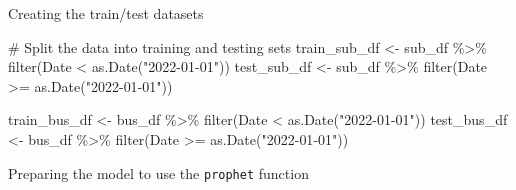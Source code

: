 \documentclass[
  letterpaper,
  DIV=11,
  numbers=noendperiod]{scrartcl}
\newenvironment{Shaded}{\begin{snugshade}}{\end{snugshade}}
\newcommand{\AttributeTok}[1]{\textcolor[rgb]{0.40,0.45,0.13}{#1}}
\newcommand{\CommentTok}[1]{\textcolor[rgb]{0.37,0.37,0.37}{#1}}
\newcommand{\DecValTok}[1]{\textcolor[rgb]{0.68,0.00,0.00}{#1}}
\newcommand{\FunctionTok}[1]{\textcolor[rgb]{0.28,0.35,0.67}{#1}}
\newcommand{\NormalTok}[1]{\textcolor[rgb]{0.00,0.23,0.31}{#1}}
\newcommand{\OtherTok}[1]{\textcolor[rgb]{0.00,0.23,0.31}{#1}}
\newcommand{\SpecialCharTok}[1]{\textcolor[rgb]{0.37,0.37,0.37}{#1}}
\newcommand{\StringTok}[1]{\textcolor[rgb]{0.13,0.47,0.30}{#1}}
\begin{document}
\begin{Shaded}
\end{Shaded}

Creating the train/test datasets

\begin{Shaded}
\begin{Highlighting}[]
\CommentTok{\# Split the data into training and testing sets}
\NormalTok{train\_sub\_df }\OtherTok{\textless{}{-}}\NormalTok{ sub\_df }\SpecialCharTok{\%\textgreater{}\%} \FunctionTok{filter}\NormalTok{(Date }\SpecialCharTok{\textless{}} \FunctionTok{as.Date}\NormalTok{(}\StringTok{"2022{-}01{-}01"}\NormalTok{))}
\NormalTok{test\_sub\_df }\OtherTok{\textless{}{-}}\NormalTok{ sub\_df }\SpecialCharTok{\%\textgreater{}\%} \FunctionTok{filter}\NormalTok{(Date }\SpecialCharTok{\textgreater{}=} \FunctionTok{as.Date}\NormalTok{(}\StringTok{"2022{-}01{-}01"}\NormalTok{))}

\NormalTok{train\_bus\_df }\OtherTok{\textless{}{-}}\NormalTok{ bus\_df }\SpecialCharTok{\%\textgreater{}\%} \FunctionTok{filter}\NormalTok{(Date }\SpecialCharTok{\textless{}} \FunctionTok{as.Date}\NormalTok{(}\StringTok{"2022{-}01{-}01"}\NormalTok{))}
\NormalTok{test\_bus\_df }\OtherTok{\textless{}{-}}\NormalTok{ bus\_df }\SpecialCharTok{\%\textgreater{}\%} \FunctionTok{filter}\NormalTok{(Date }\SpecialCharTok{\textgreater{}=} \FunctionTok{as.Date}\NormalTok{(}\StringTok{"2022{-}01{-}01"}\NormalTok{))}
\end{Highlighting}
\end{Shaded}

Preparing the model to use the \texttt{prophet} function
\end{document}
